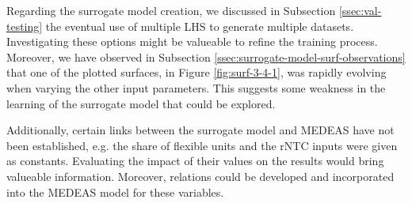 Regarding the surrogate model creation, we discussed in Subsection \ref{ssec:val-testing} the eventual use of multiple LHS to generate multiple datasets. Investigating these options might be valueable to refine the training process. Moreover, we have observed in Subsection \ref{ssec:surrogate-model-surf-observations} that one of the plotted surfaces, in Figure \ref{fig:surf-3-4-1}, was rapidly evolving when varying the other input parameters. This suggests some weakness in the learning of the surrogate model that could be explored.

Additionally, certain links between the surrogate model and MEDEAS have not been established, e.g. the share of flexible units and the rNTC inputs were given as constants. Evaluating the impact of their values on the results would bring valueable information. Moreover, relations could be developed and incorporated into the MEDEAS model for these variables.